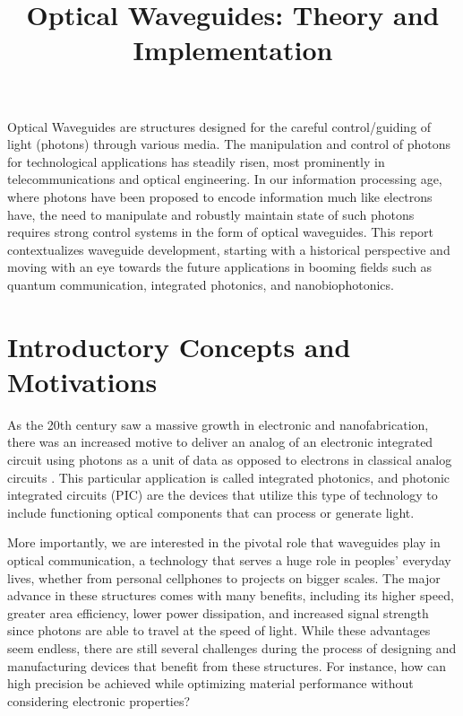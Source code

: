 \documentclass[10pt]{article}
\begin{document}
\noindent



\title{Optical Waveguides: Theory and Implementation}




\maketitle


\abstract
Optical Waveguides are structures designed for the careful control/guiding of light (photons) through various media. The manipulation and control of photons 
for technological applications has steadily risen, most prominently in telecommunications and optical engineering. In our information 
processing age, where photons have been proposed to encode information much like electrons have, the need to manipulate and robustly maintain state 
of such photons requires strong control systems in the form of optical waveguides. This report contextualizes waveguide development, 
starting with a historical perspective and moving with an eye towards the future applications in booming fields such as quantum communication, integrated photonics, 
and nanobiophotonics. 

\section{Introductory Concepts and Motivations}

As the 20th century saw a massive growth in electronic and nanofabrication, 
there was an increased motive to deliver an analog of an electronic integrated
circuit using photons as a unit of data as opposed to electrons in classical analog circuits \cite{ref01}.
This particular application is called integrated photonics, and photonic integrated circuits (PIC) 
are the devices that utilize this type of technology to include functioning optical components that can 
process or generate light. 

More importantly, we are interested in the pivotal role that waveguides play in 
optical communication, a technology that serves a huge role in peoples’ everyday lives, whether from personal 
cellphones to projects on bigger scales. The major advance in these structures comes with many benefits, 
including its higher speed, greater area efficiency, lower power dissipation, and increased signal strength 
since photons are able to travel at the speed of light. While these advantages seem endless, there are still 
several challenges during the process of designing and manufacturing devices that benefit from these structures.
For instance, how can high precision be achieved while optimizing material performance without considering electronic 
properties? 
\end{document}
